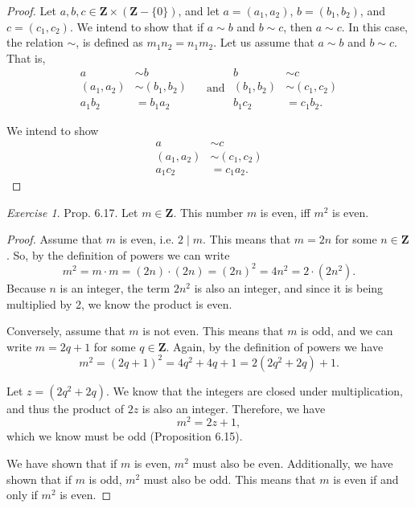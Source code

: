 \documentclass[12pt,oneside]{amsart}
\theoremstyle{remark}
\newtheorem{exer}{Exercise}
\newcommand{\bfZ}{\mathbf{Z}}
\begin{document}
\begin{proof}
Let $a, b, c \in \bfZ \times (\bfZ - \{0\})$, and let $a = (a_1, a_2)$, $b = (b_1, b_2)$, and $c = (c_1, c_2)$. We intend to show that if $a \sim b$ and $b \sim c$, then $a \sim c$. In this case, the relation $\sim$, is defined as $m_1n_2 = n_1m_2$. Let us assume that $a \sim b$ and $b \sim c$. That is,
\begin{equation}
\begin{split}
         a &\sim b \\
(a_1, a_2) &\sim (b_1, b_2) \\
    a_1b_2 &= b_1a_2
\end{split}
\quad\text{ and }
\begin{split}
         b &\sim c \\
(b_1, b_2) &\sim (c_1, c_2) \\
    b_1c_2 &= c_1b_2.
\end{split}
\end{equation}

We intend to show
\begin{equation}
\begin{split}
         a &\sim c \\
(a_1, a_2) &\sim (c_1, c_2) \\
    a_1c_2 &= c_1a_2.
\end{split}
\end{equation}


\end{proof}

%
%
%
%
\newpage
\begin{exer}
Prop. 6.17. Let $m \in \bfZ$. This number $m$ is even, iff $m^2$ is even.
\end{exer}

%
\begin{proof}
Assume that $m$ is even, i.e. $2 \mid m$. This means that $m = 2n$ for some $n \in \bfZ$. So, by the definition of powers we can write \[ m^2 = m \cdot m = (2n) \cdot (2n) = (2n)^2 = 4n^2 = 2 \cdot (2n^2). \] Because $n$ is an integer, the term $2n^2$ is also an integer, and since it is being multiplied by 2, we know the product is even.

Conversely, assume that $m$ is not even. This means that $m$ is odd, and we can write $m = 2q + 1$ for some $q \in \bfZ$. Again, by the definition of powers we have \[ m^2 = (2q + 1)^2 = 4q^2 + 4q + 1 = 2(2q^2 + 2q) + 1. \]

Let $z = (2q^2 + 2q)$. We know that the integers are closed under multiplication, and thus the product of $2z$ is also an integer. Therefore, we have \[ m^2 = 2z +1, \] which we know must be odd (Proposition 6.15).

We have shown that if $m$ is even, $m^2$ must also be even. Additionally, we have shown that if $m$ is odd, $m^2$ must also be odd. This means that $m$ is even if and only if $m^2$ is even.
\end{proof}
\end{document}
